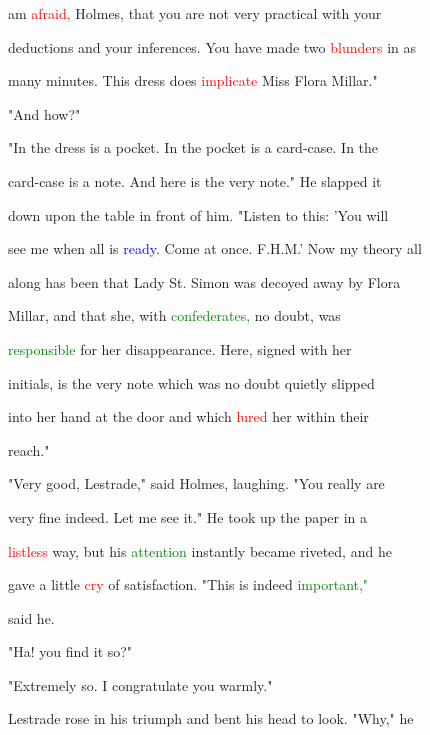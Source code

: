  am \textcolor{red}{afraid,} Holmes, that you are not very practical with your

 deductions and your inferences. You have made two \textcolor{red}{blunders} in as

 many minutes. This dress does \textcolor{red}{implicate} Miss Flora Millar."



 "And how?"



 "In the dress is a pocket. In the pocket is a card-case. In the

 card-case is a note. And here is the very note." He \textcolor{BurntOrange}{slapped} it

 down upon the table in front of him. "Listen to this: 'You will

 see me when all is \textcolor{blue}{ready.} Come at once. F.H.M.' Now my \textcolor{BurntOrange}{theory} all

 along has been that Lady St. Simon was decoyed away by Flora

 Millar, and that she, with \textcolor{green}{confederates,} no \textcolor{BurntOrange}{doubt,} was

 \textcolor{green}{responsible} for her disappearance. Here, signed with her

 initials, is the very note which was no \textcolor{BurntOrange}{doubt} quietly \textcolor{BurntOrange}{slipped}

 into her hand at the door and which \textcolor{red}{lured} her within their

 reach."



 "Very \textcolor{BurntOrange}{good,} Lestrade," said Holmes, \textcolor{BurntOrange}{laughing.} "You really are

 very fine indeed. Let me see it." He took up the paper in a

 \textcolor{red}{listless} way, but his \textcolor{green}{attention} instantly became riveted, and he

 gave a little \textcolor{red}{cry} of satisfaction. "This is indeed \textcolor{green}{important,"}

 said he.



 "Ha! you find it so?"



 "Extremely so. I congratulate you warmly."



 Lestrade rose in his \textcolor{BurntOrange}{triumph} and bent his head to look. "Why," he

